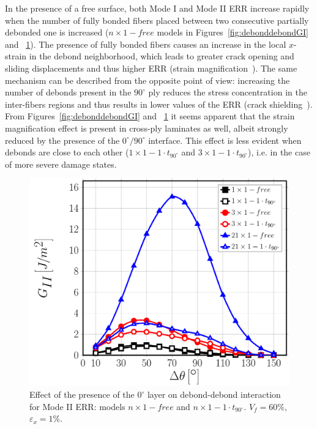 \documentclass[review]{elsarticle}
\begin{document}
In the presence of a free surface, both Mode I and Mode II ERR increase rapidly when the number of fully bonded fibers placed between two consecutive partially debonded one is increased ($n\times 1-free$ models in Figures~\ref{fig:debonddebondGI} and ~\ref{fig:debonddebondGII}). The presence of fully bonded fibers causes an increase in the local $x$-strain in the debond neighborhood, which leads to greater crack opening and sliding displacements and thus higher ERR (strain magnification~\cite{DiStasio2019}). The same mechanism can be described from the opposite point of view: increasing the number of debonds present in the $90^{\circ}$ ply reduces the stress concentration in the inter-fibers regions and thus results in lower values of the ERR (crack shielding~\cite{Garcia2015,DiStasio2019}). From Figures~\ref{fig:debonddebondGI} and ~\ref{fig:debonddebondGII} it seems apparent that the strain magnification effect is present in cross-ply laminates as well, albeit strongly reduced by the presence of the $0^{\circ}/90^{\circ}$ interface. This effect is less evident when debonds are close to each other ($1\times 1-1\cdot t_{90^{\circ}}$ and $3\times 1-1\cdot t_{90^{\circ}}$), i.e. in the case of more severe damage states.

\begin{figure}[!h]
\centering
\includegraphics[width=\textwidth]{nx1-1-vf60-GII.pdf}
\caption{Effect of the presence of the $0^{\circ}$ layer on debond-debond interaction for Mode II ERR: models $n\times 1-free$ and $n\times 1-1\cdot t_{90^{\circ}}$. $V_{f}=60\%$, $\varepsilon_{x}=1\%$.}\label{fig:debonddebondGII}
\end{figure}
\end{document}
